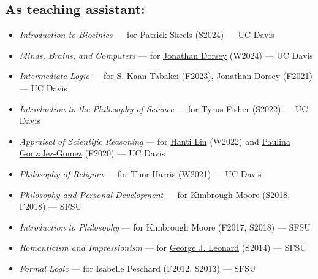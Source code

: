 \documentclass{article}
\begin{document}
\subsection*{As teaching assistant:}
\begin{itemize}
    \item \textit{Introduction to Bioethics} --- for \href{https://pdskeels.wixsite.com/paton}{Patrick Skeels} (S2024) --- UC Davis
    \item \textit{Minds, Brains, and Computers} --- for \href{https://sites.google.com/site/jonathanedorsey/}{Jonathan Dorsey} (W2024) --- UC Davis
    \item \textit{Intermediate Logic} --- for \href{https://sites.google.com/view/skaantabakci}{S. Kaan Tabakci} (F2023), Jonathan Dorsey (F2021) --- UC Davis
    \item \textit{Introduction to the Philosophy of Science} --- for Tyrus Fisher (S2022) --- UC Davis
    \item \textit{Appraisal of Scientific Reasoning} --- for \href{https://sites.google.com/site/hantilinphil/}{Hanti Lin} (W2022) and \href{https://plgonzalezgomez.wixsite.com/plgonzalezgomez/home}{Paulina Gonzalez-Gomez} (F2020) --- UC Davis
    \item \textit{Philosophy of Religion} --- for Thor Harris (W2021) --- UC Davis
    \item \textit{Philosophy and Personal Development} --- for \href{https://philosophy.sfsu.edu/people/kimbrough-moore}{Kimbrough Moore} (S2018, F2018) --- SFSU
    \item \textit{Introduction to Philosophy} --- for Kimbrough Moore (F2017, S2018) --- SFSU
    \item \textit{Romanticism and Impressionism} --- for \href{https://www.georgeleonard.com/}{George J. Leonard} (S2014) --- SFSU
    \item \textit{Formal Logic} --- for Isabelle Peschard (F2012, S2013) --- SFSU
\end{itemize}


\end{document}
